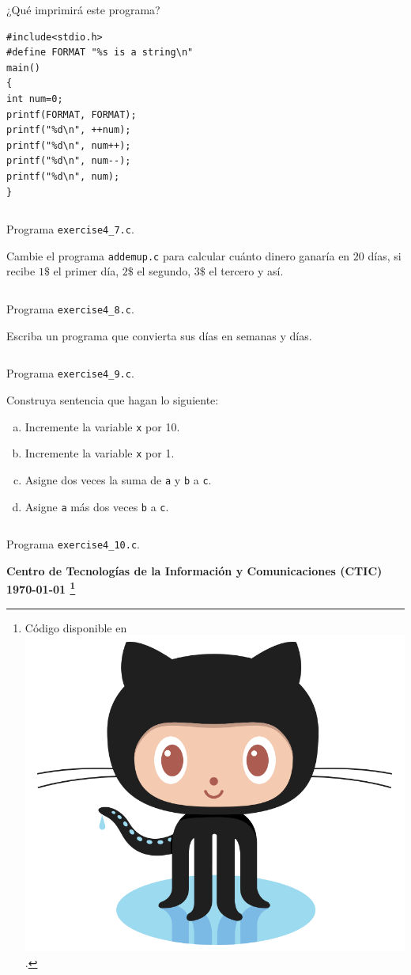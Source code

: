 \documentclass[spanish,addpoints,answers,a4paper]{exam}
\newcommand{\unmarkedfntext}[1]{%
	\begingroup
	\renewcommand\thefootnote{}\footnote{#1}%
	\addtocounter{footnote}{-1}%
	\endgroup
}
\newcommand{\mychar}{%
	\begingroup\normalfont
	\includegraphics[height=\fontcharht\font`\B]{Octocat.png}%
	\endgroup
}
\begin{document}
\begin{questions}
\question ¿Qué imprimirá este programa?

\begin{verbatim}
#include<stdio.h>
#define FORMAT "%s is a string\n"
main()
{
int num=0;
printf(FORMAT, FORMAT);
printf("%d\n", ++num);
printf("%d\n", num++);
printf("%d\n", num--);
printf("%d\n", num);
}
\end{verbatim}

\begin{solution}
	
\begin{listing}[H]
	\footnotesize
	\inputminted{c}{exercise4_7.c}
	\caption{Programa \texttt{exercise4\_7.c}.}
	\label{lst:4.7}
\end{listing}
\end{solution}

\question Cambie el programa \texttt{addemup.c} para calcular cuánto dinero ganaría en $20$ días, si recibe $1\$$ el primer día, $2\$$ el segundo, $3\$$ el tercero y así.

\begin{solution}

\begin{listing}[H]
	\footnotesize
	\inputminted{c}{exercise4_8.c}
	\caption{Programa \texttt{exercise4\_8.c}.}
	\label{lst:4.8}
\end{listing}
\end{solution}

\question Escriba un programa que convierta sus días en semanas y días.

\begin{solution}
	
\begin{listing}[H]
	\footnotesize
	\inputminted{c}{exercise4_9.c}
	\caption{Programa \texttt{exercise4\_9.c}.}
	\label{lst:4.9}
\end{listing}
\end{solution}

\question Construya sentencia que hagan lo siguiente:

\begin{enumerate}[a.]
	\item Incremente la variable \texttt{x} por 10.
	\item Incremente la variable \texttt{x} por 1.
	\item Asigne dos veces la suma de \texttt{a} y \texttt{b} a \texttt{c}.
	\item Asigne \texttt{a} más dos veces \texttt{b} a \texttt{c}.
\end{enumerate}

\begin{solution}
	
\begin{listing}[H]
	\footnotesize
	\inputminted{c}{exercise4_10.c}
	\caption{Programa \texttt{exercise4\_10.c}.}
	\label{lst:4.10}
\end{listing}
\end{solution}

\end{questions}

\begin{flushright}\bfseries
Centro de Tecnologías de la Información y Comunicaciones (CTIC)\\[2mm]
\today\unmarkedfntext{Código disponible en \href{https://github.com/carlosal1015/C-Programming}{\mychar{}}.}
\end{flushright}
\end{document}
